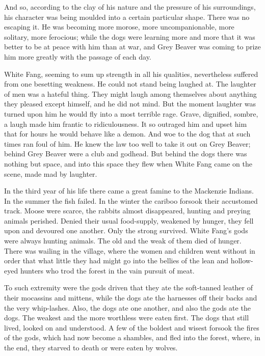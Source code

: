\documentclass[10pt]{book}
\begin{document}
And so, according to the clay of his nature and the pressure of his
surroundings, his character was being moulded into a certain particular
shape. There was no escaping it. He was becoming more morose, more
uncompanionable, more solitary, more ferocious; while the dogs were
learning more and more that it was better to be at peace with him than
at war, and Grey Beaver was coming to prize him more greatly with the
passage of each day.

White Fang, seeming to sum up strength in all his qualities,
nevertheless suffered from one besetting weakness. He could not stand
being laughed at. The laughter of men was a hateful thing. They might
laugh among themselves about anything they pleased except himself, and
he did not mind. But the moment laughter was turned upon him he would
fly into a most terrible rage. Grave, dignified, sombre, a laugh made
him frantic to ridiculousness. It so outraged him and upset him that
for hours he would behave like a demon. And woe to the dog that at such
times ran foul of him. He knew the law too well to take it out on Grey
Beaver; behind Grey Beaver were a club and godhead. But behind the dogs
there was nothing but space, and into this space they flew when White
Fang came on the scene, made mad by laughter.

In the third year of his life there came a great famine to the
Mackenzie Indians. In the summer the fish failed. In the winter the
cariboo forsook their accustomed track. Moose were scarce, the rabbits
almost disappeared, hunting and preying animals perished. Denied their
usual food-supply, weakened by hunger, they fell upon and devoured one
another. Only the strong survived. White Fang’s gods were always
hunting animals. The old and the weak of them died of hunger. There was
wailing in the village, where the women and children went without in
order that what little they had might go into the bellies of the lean
and hollow-eyed hunters who trod the forest in the vain pursuit of
meat.

To such extremity were the gods driven that they ate the soft-tanned
leather of their mocassins and mittens, while the dogs ate the
harnesses off their backs and the very whip-lashes. Also, the dogs ate
one another, and also the gods ate the dogs. The weakest and the more
worthless were eaten first. The dogs that still lived, looked on and
understood. A few of the boldest and wisest forsook the fires of the
gods, which had now become a shambles, and fled into the forest, where,
in the end, they starved to death or were eaten by wolves.
\end{document}
